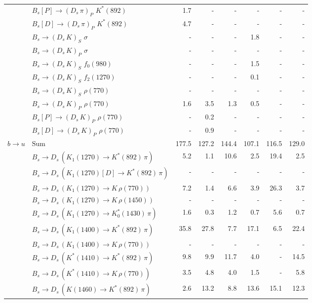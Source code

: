 \begin{tabular}{l l  r  r  r  r  r  r  }
 & $B_s[P] \to ( D_s \, \pi)_{P} \, \, K^{*}(892)$ & 1.7 & -  & -  & -  & -  & -  \\ 
 & $B_s[D] \to ( D_s \, \pi)_{P} \, \, K^{*}(892)$ & 4.7 & -  & -  & -  & -  & -  \\ 
 & $B_s \to ( D_s \, K)_{S} \, \, \sigma$ & -  & -  & -  & 1.8 & -  & -  \\ 
 & $B_s \to ( D_s \, K)_{P} \, \, \sigma$ & -  & -  & -  & -  & -  & -  \\ 
 & $B_s \to ( D_s \, K)_{S} \, \, f_0(980)$ & -  & -  & -  & 1.5 & -  & -  \\ 
 & $B_s \to ( D_s \, K)_{S} \, \, f_2(1270)$ & -  & -  & -  & 0.1 & -  & -  \\ 
 & $B_s \to ( D_s \, K)_{S} \, \, \rho(770)$ & -  & -  & -  & -  & -  & -  \\ 
 & $B_s \to ( D_s \, K)_{P} \, \, \rho(770)$ & 1.6 & 3.5 & 1.3 & 0.5 & -  & -  \\ 
 & $B_s[P] \to ( D_s \, K)_{P} \, \, \rho(770)$ & -  & 0.2 & -  & -  & -  & -  \\ 
 & $B_s[D] \to ( D_s \, K)_{P} \, \, \rho(770)$ & -  & 0.9 & -  & -  & -  & -  \\ 
\multirow{28}{*}{$b \to u$}  & $\text{Sum}$ & 177.5 & 127.2 & 144.4 & 107.1 & 116.5 & 129.0 \\ 
\hline
 & $B_s \to D_s \, ( K_1(1270) \to K^{*}(892) \, \pi )$ & 5.2 & 1.1 & 10.6 & 2.5 & 19.4 & 2.5 \\ 
 & $B_s \to D_s \, ( K_1(1270)[D] \to K^{*}(892) \, \pi )$ & -  & -  & -  & -  & -  & -  \\ 
 & $B_s \to D_s \, ( K_1(1270) \to K \, \rho(770) )$ & 7.2 & 1.4 & 6.6 & 3.9 & 26.3 & 3.7 \\ 
 & $B_s \to D_s \, ( K_1(1270) \to K \, \rho(1450) )$ & -  & -  & -  & -  & -  & -  \\ 
 & $B_s \to D_s \, ( K_1(1270) \to K^{*}_{0}(1430) \, \pi )$ & 1.6 & 0.3 & 1.2 & 0.7 & 5.6 & 0.7 \\ 
 & $B_s \to D_s \, ( K_1(1400) \to K^{*}(892) \, \pi )$ & 35.8 & 27.8 & 7.7 & 17.1 & 6.5 & 22.4 \\ 
 & $B_s \to D_s \, ( K_1(1400) \to K \, \rho(770) )$ & -  & -  & -  & -  & -  & -  \\ 
 & $B_s \to D_s \, ( K^{*}(1410) \to K^{*}(892) \, \pi )$ & 9.8 & 9.9 & 11.7 & 4.0 & -  & 14.5 \\ 
 & $B_s \to D_s \, ( K^{*}(1410) \to K \, \rho(770) )$ & 3.5 & 4.8 & 4.0 & 1.5 & -  & 5.8 \\ 
 & $B_s \to D_s \, ( K(1460) \to K^{*}(892) \, \pi )$ & 2.6 & 13.2 & 8.8 & 13.6 & 15.1 & 12.3 \\ 

\end{tabular}
